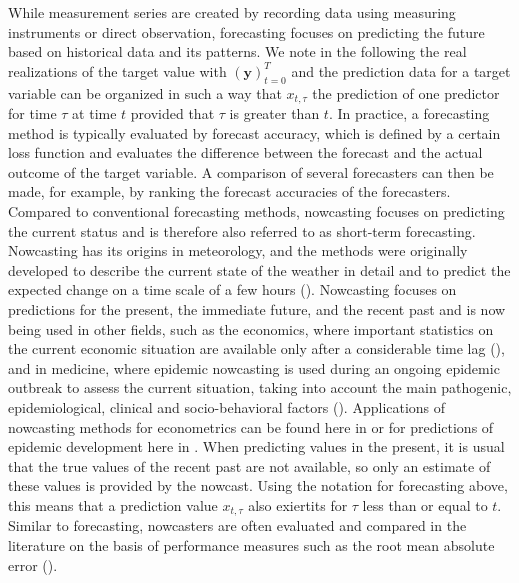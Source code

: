 While measurement series are created by recording data using measuring instruments or direct observation, forecasting focuses on predicting the future based on historical data and its patterns. We note in the following the real realizations of the target value with $(\mathbf{y})^T_{t=0}$ and the prediction data for a target variable can be organized in such a way that $x_{t,\tau}$ the prediction of one predictor for time $\tau$ at time $t$ provided that $\tau$ is greater than $t$. 
In practice, a forecasting method is typically evaluated by forecast accuracy, which is defined by a certain loss function and evaluates the difference between the forecast and the actual outcome of the target variable.
A comparison of several forecasters can then be made, for example, by ranking the forecast accuracies of the forecasters.
Compared to conventional forecasting methods, nowcasting focuses on predicting the current status and is therefore also referred to as short-term forecasting. Nowcasting  has its origins in meteorology, and the methods were originally developed to describe the current state of the weather in detail and to predict the expected change on a time scale of a few hours (\cite{browning1989nowcasting,schmid2019nowcasting}).
Nowcasting focuses on predictions for the present, the immediate future, and the recent past and is now being used in other fields, such as the economics, where important statistics on the current economic situation are available only after a considerable time lag (\cite{banbura2013now}), and in medicine, where epidemic nowcasting is used during an ongoing epidemic outbreak to assess the current situation, taking into account the main pathogenic, epidemiological, clinical and socio-behavioral factors (\cite{wu2021nowcasting}). 
Applications of nowcasting methods for econometrics can be found here in \cite{giannone2006nowcasting,fornaro2020nowcasting,bok2018macroeconomic} or for predictions of epidemic development here in \cite{johansson2014nowcasting,gunther2021nowcasting,birrell2021real}. 
When predicting values in the present, it is usual that the true values of the recent past are not available, so only an estimate of these values is provided by the nowcast.
Using the notation for forecasting above, this means that a prediction value $x_{t,\tau}$ also exiertits  for $\tau$ less than or equal to $t$.
Similar to forecasting, nowcasters are often evaluated and compared in the literature on the basis of performance measures such as the root mean absolute error (\cite{gunther2021nowcasting}).

